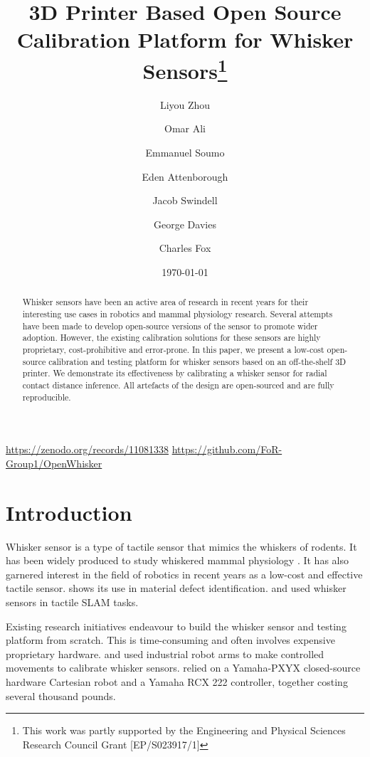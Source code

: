 \documentclass[runningheads]{llncs}
\title{3D Printer Based Open Source Calibration Platform for Whisker Sensors\thanks{This work was partly supported by the Engineering and Physical Sciences
Research Council Grant [EP/S023917/1]}}
\author{
    Liyou Zhou\orcidID{0009-0005-9491-9003} \and
    Omar Ali \orcidID{0009-0009-3523-6084} \and
    Emmanuel Soumo \and
    Eden Attenborough \and
    Jacob Swindell \and
    George Davies \and
    Charles Fox
}
\institute{School of Computer Science, University of Lincoln, Lincoln, UK}
\date{\today}
\begin{document}
\maketitle

\vspace{-10pt}

\begin{center}
    \url{https://zenodo.org/records/11081338}
    \url{https://github.com/FoR-Group1/OpenWhisker}
\end{center}

\begin{abstract}
Whisker sensors have been an active area of research in recent years for their interesting use cases in robotics and mammal physiology research. Several attempts have been made to develop open-source versions of the sensor to promote wider adoption. However, the existing calibration solutions for these sensors are highly proprietary, cost-prohibitive and error-prone. In this paper, we present a low-cost open-source calibration and testing platform for whisker sensors based on an off-the-shelf 3D printer. We demonstrate its effectiveness by calibrating a whisker sensor for radial contact distance inference. All artefacts of the design are open-sourced and are fully reproducible.
\end{abstract}

\section{Introduction}

Whisker sensor is a type of tactile sensor that mimics the whiskers of rodents. It has been widely produced to study whiskered mammal physiology \cite{prescottActiveTouchSensing2020}. It has also garnered interest in the field of robotics in recent years as a low-cost and effective tactile sensor. \cite{fotouhiDetectionBarelyVisible2021} shows its use in material defect identification. \cite{struckmeierViTaSLAMBioinspiredVisuoTactile2019} and \cite{foxTactileSLAMBiomimetic2012} used whisker sensors in tactile SLAM tasks.

Existing research initiatives endeavour to build the whisker sensor and testing platform from scratch. This is time-consuming and often involves expensive proprietary hardware. \cite{sullivanTactileDiscriminationUsing2012} and \cite{fotouhiDetectionBarelyVisible2021} used industrial robot arms to make controlled movements to calibrate whisker sensors. \cite{evansWhiskerobjectContactSpeed2010} relied on a Yamaha-PXYX closed-source hardware Cartesian robot and a Yamaha RCX 222 controller, together costing several thousand pounds.
\end{document}
